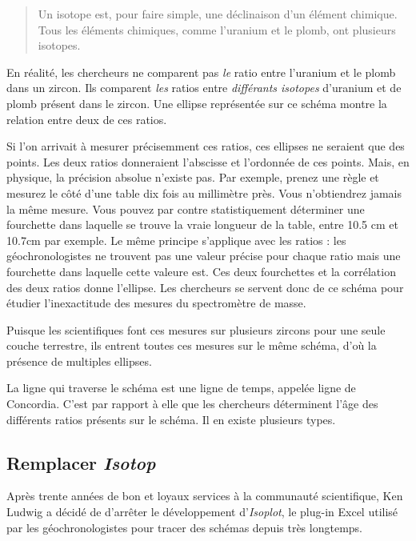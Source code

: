 \begin{quote}
Un isotope est, pour faire simple, une déclinaison d'un élément chimique. Tous les éléments chimiques, comme l'uranium et le plomb, ont plusieurs isotopes.
\end{quote}

En réalité, les chercheurs ne comparent pas \emph{le} ratio entre l'uranium et le plomb dans un zircon. Ils comparent \emph{les} ratios entre \emph{différants isotopes} d'uranium et de plomb présent dans le zircon.
Une ellipse représentée sur ce schéma montre la relation entre deux de ces ratios.

Si l'on arrivait à mesurer précisemment ces ratios, ces ellipses ne seraient que des points. Les deux ratios donneraient l'abscisse et l'ordonnée de ces points. Mais, en physique, la précision absolue n'existe pas. Par exemple, prenez une règle et mesurez le côté d'une table dix fois au millimètre près. Vous n'obtiendrez jamais la même mesure. Vous pouvez par contre statistiquement déterminer une fourchette dans laquelle se trouve la vraie longueur de la table, entre 10.5 cm et 10.7cm par exemple. Le même principe s'applique avec les ratios : les géochronologistes ne trouvent pas une valeur précise pour chaque ratio mais une fourchette dans laquelle cette valeure est. Ces deux fourchettes et la corrélation des deux ratios donne l'ellipse. Les chercheurs se servent donc de ce schéma pour étudier l'inexactitude des mesures du spectromètre de masse.

Puisque les scientifiques font ces mesures sur plusieurs zircons pour une seule couche terrestre, ils entrent toutes ces mesures sur le même schéma, d'où la présence de multiples ellipses.

La ligne qui traverse le schéma est une ligne de temps, appelée ligne de Concordia. C'est par rapport à elle que les chercheurs déterminent l'âge des différents ratios présents sur le schéma. Il en existe plusieurs types.

\subsection{Remplacer \textit{Isotop}}
Après trente années de bon et loyaux services à la communauté scientifique, Ken Ludwig a décidé de d'arrêter le développement d'\textit{Isoplot}, le plug-in Excel utilisé par les géochronologistes pour tracer des schémas depuis très longtemps.

